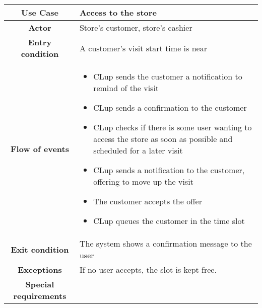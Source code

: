 \documentclass[../../main.tex]{subfiles}
\begin{document}
    \begin{table}[H]
      \centering
        \begin{tabular}{c m{}}
        \hline
        \textbf{Use Case} & Access to the store\\ \hline
        \textbf{Actor} & Store's customer, store's cashier\\ \hline
        \textbf{Entry condition} & A customer's visit start time is near\\  \hline
        \textbf{Flow of events} & \begin{itemize}
                                    \item CLup sends the customer a notification to remind of the visit
                                    \item CLup sends a confirmation to the customer
                                    \item CLup checks if there is some user wanting to access the store as soon as possible and scheduled for a later visit
                                    \item CLup sends a notification to the customer, offering to move up the visit
                                    \item The customer accepts the offer
                                    \item CLup queues the customer in the time slot
                                  \end{itemize}\\ \hline
        \textbf{Exit condition} & The system shows a confirmation message to the user \\ \hline
        \textbf{Exceptions} & If no user accepts, the slot is kept free. \\ \hline
        \textbf{Special requirements} &\\ \hline
        \end{tabular}
    \end{table}

        
\end{document}
